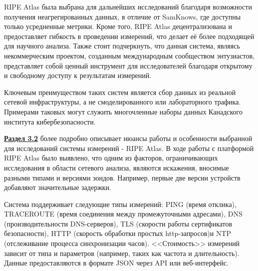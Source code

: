 RIPE Atlas была выбрана для дальнейших исследований благодаря возможности получения неагрегированных данных, в отличие от SamKnows, где доступны только усредненные метрики. %
Кроме того, RIPE Atlas децентрализована и предоставляет гибкость в проведении измерений, что делает её более подходящей для научного анализа. Также стоит подчеркнуть, что данная система, являясь некоммерческим проектом, созданным международным сообществом энтузиастов, представляет собой ценный инструмент для исследователей благодаря открытому и свободному доступу к результатам измерений.

Ключевым преимуществом таких систем является сбор данных из реальной сетевой инфраструктуры, а не смоделированного или лабораторного трафика. Примерами таковых могут служить многочленные наборы данных Канадского института кибербезопасности. %


\underline{\textbf{Раздел 3.2}} более подробно описывает нюансы работы и особенности выбранной для исследований системы измерений - RIPE Atlas. В ходе работы с платформой RIPE Atlas было выявлено, что одним из факторов, ограничивающих исследования в области сетевого анализа, являются искажения, вносимые разными типами и версиями зондов. Например, первые две версии устройств добавляют значительные задержки. 

 Система поддерживает следующие типы измерений: PING (время отклика), TRACEROUTE (время соединения между промежуточными адресами), DNS (производительности DNS-серверов), TLS (скорости работы сертификатов безопасности), HTTP (скорость обработки простых http-запросов)и NTP (отслеживание процесса синхронизации часов). <<Стоимость>> измерений зависит от типа и параметров (например, таких как частота и длительность). Данные предоставляются в формате JSON через API или веб-интерфейс.

